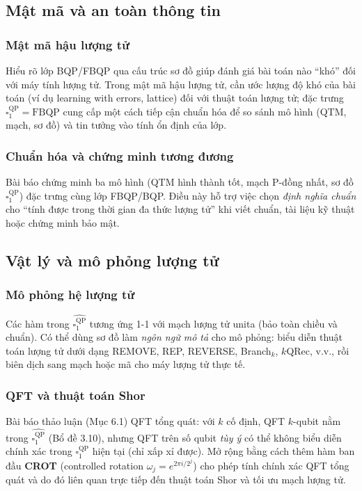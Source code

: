 \documentclass[10pt]{article}
\begin{document}
\subsection*{Mật mã và an toàn thông tin}

\subsubsection*{Mật mã hậu lượng tử}
Hiểu rõ lớp BQP/FBQP qua cấu trúc sơ đồ giúp đánh giá bài toán nào ``khó'' đối với máy tính lượng tử. Trong mật mã hậu lượng tử, cần ước lượng độ khó của bài toán (ví dụ learning with errors, lattice) đối với thuật toán lượng tử; đặc trưng $\square_1^{\mathrm{QP}}=\mathrm{FBQP}$ cung cấp một cách tiếp cận chuẩn hóa để so sánh mô hình (QTM, mạch, sơ đồ) và tin tưởng vào tính ổn định của lớp.

\subsubsection*{Chuẩn hóa và chứng minh tương đương}
Bài báo chứng minh ba mô hình (QTM hình thành tốt, mạch P-đồng nhất, sơ đồ $\square_1^{\mathrm{QP}}$) đặc trưng cùng lớp FBQP/BQP. Điều này hỗ trợ việc chọn \emph{định nghĩa chuẩn} cho ``tính được trong thời gian đa thức lượng tử'' khi viết chuẩn, tài liệu kỹ thuật hoặc chứng minh bảo mật.

\subsection*{Vật lý và mô phỏng lượng tử}

\subsubsection*{Mô phỏng hệ lượng tử}
Các hàm trong $\widehat{\square_1^{\mathrm{QP}}}$ tương ứng 1-1 với mạch lượng tử unita (bảo toàn chiều và chuẩn). Có thể dùng sơ đồ làm \emph{ngôn ngữ mô tả} cho mô phỏng: biểu diễn thuật toán lượng tử dưới dạng REMOVE, REP, REVERSE, Branch$_k$, $k$QRec, v.v., rồi biên dịch sang mạch hoặc mã cho máy lượng tử thực tế.

\subsubsection*{QFT và thuật toán Shor}
Bài báo thảo luận (Mục 6.1) QFT tổng quát: với $k$ cố định, QFT $k$-qubit nằm trong $\widehat{\square_1^{\mathrm{QP}}}$ (Bổ đề 3.10), nhưng QFT trên số qubit \emph{tùy ý} có thể không biểu diễn chính xác trong $\square_1^{\mathrm{QP}}$ hiện tại (chỉ xấp xỉ được). Mở rộng bằng cách thêm hàm ban đầu \textbf{CROT} (controlled rotation $\omega_j=e^{2\pi i/2^j}$) cho phép tính chính xác QFT tổng quát và do đó liên quan trực tiếp đến thuật toán Shor và tối ưu mạch lượng tử.
\end{document}
